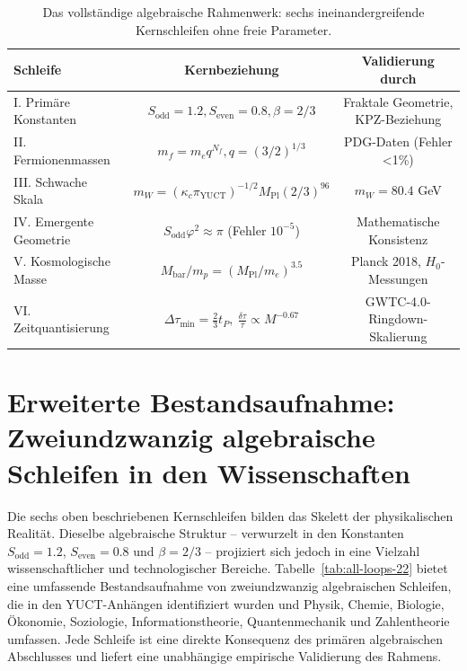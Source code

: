 \documentclass[12pt,a4paper]{article}
\begin{document}
	\begin{table}[htbp]
		\centering
		\caption{Das vollständige algebraische Rahmenwerk: sechs ineinandergreifende Kernschleifen ohne freie Parameter.}
		\label{tab:all-loops}
		\footnotesize
		\begin{tabular}{l c c}
			\toprule
			\textbf{Schleife} & \textbf{Kernbeziehung} & \textbf{Validierung durch} \\
			\midrule
			I. Primäre Konstanten & \(S_{\mathrm{odd}}=1.2, S_{\mathrm{even}}=0.8, \beta=2/3\) & Fraktale Geometrie, KPZ-Beziehung \\
			II. Fermionenmassen & \(m_f = m_e q^{N_f}, q=(3/2)^{1/3}\) & PDG-Daten (Fehler <1\%) \\
			III. Schwache Skala & \(m_W = (\kappa_c \pi_{\mathrm{YUCT}})^{-1/2} M_{\mathrm{Pl}} (2/3)^{96}\) & \(m_W = 80.4\) GeV \\
			IV. Emergente Geometrie & \(S_{\mathrm{odd}}\varphi^2 \approx \pi\) (Fehler \(10^{-5}\)) & Mathematische Konsistenz \\
			V. Kosmologische Masse & \(M_{\mathrm{bar}}/m_p = (M_{\mathrm{Pl}}/m_e)^{3.5}\) & Planck 2018, \(H_0\)-Messungen \\
			VI. Zeitquantisierung & \(\Delta \tau_{\min} = \frac{2}{3} t_P, \ \frac{\delta \tau}{\tau} \propto M^{-0.67}\) & GWTC-4.0-Ringdown-Skalierung \\
			\bottomrule
		\end{tabular}
	\end{table}
	
	\section*{Erweiterte Bestandsaufnahme: Zweiundzwanzig algebraische Schleifen in den Wissenschaften}
	
	Die sechs oben beschriebenen Kernschleifen bilden das Skelett der physikalischen Realität. Dieselbe algebraische Struktur – verwurzelt in den Konstanten \(S_{\mathrm{odd}} = 1.2\), \(S_{\mathrm{even}} = 0.8\) und \(\beta = 2/3\) – projiziert sich jedoch in eine Vielzahl wissenschaftlicher und technologischer Bereiche. Tabelle~\ref{tab:all-loops-22} bietet eine umfassende Bestandsaufnahme von zweiundzwanzig algebraischen Schleifen, die in den YUCT-Anhängen identifiziert wurden und Physik, Chemie, Biologie, Ökonomie, Soziologie, Informationstheorie, Quantenmechanik und Zahlentheorie umfassen. Jede Schleife ist eine direkte Konsequenz des primären algebraischen Abschlusses und liefert eine unabhängige empirische Validierung des Rahmens.
	
\end{document}
